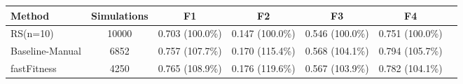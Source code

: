 \begin{tabular}{lcccccc}
\toprule
         Method &  Simulations &              F1 &              F2 &              F3 &              F4 \\
\midrule
       RS(n=10) &        10000 & 0.703 (100.0\%) & 0.147 (100.0\%) & 0.546 (100.0\%) & 0.751 (100.0\%) \\
Baseline-Manual &         6852 & 0.757 (107.7\%) & 0.170 (115.4\%) & 0.568 (104.1\%) & 0.794 (105.7\%) \\
    fastFitness &         4250 & 0.765 (108.9\%) & 0.176 (119.6\%) & 0.567 (103.9\%) & 0.782 (104.1\%) \\
\bottomrule
\end{tabular}
